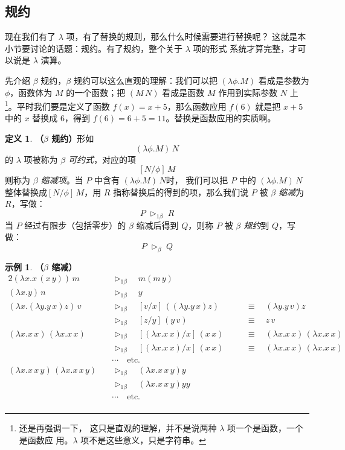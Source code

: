 \documentclass[a4paper,adobefonts]{ctexart}
\theoremstyle{definition}
\newtheorem{definition}{定义}
\newtheorem{example}{示例}
\begin{document}
\subsection{规约}

现在我们有了 $\lambda$ 项，有了替换的规则，那么什么时候需要进行替换呢？
这就是本小节要讨论的话题：规约。有了规约，整个关于 $\lambda$ 项的形式
系统才算完整，才可以说是 $\lambda$ 演算。

先介绍 $\beta$ 规约，$\beta$ 规约可以这么直观的理解：我们可以把
$(\lambda\phi.M)$ 看成是参数为 $\phi$，函数体为 $M$ 的一个函数；把
$(M\,N)$ 看成是函数 $M$ 作用到实际参数 $N$ 上\footnote{还是再强调一下，
  这只是直观的理解，并不是说两种 $\lambda$ 项一个是函数，一个是函数应
  用。$\lambda$ 项不是这些意义，只是字符串。}。平时我们要是定义了函数
$f(x)=x+5$，那么函数应用 $f(6)$ 就是把 $x+5$ 中的 $x$ 替换成 6，得到
$f(6)=6+5=11$。替换是函数应用的实质啊。

\begin{definition}{\bfseries{（$\beta$ 规约）}}\label{def:betareduce}
  形如
  $$
  (\lambda\phi.M)\,N
  $$
  的 $\lambda$ 项被称为 \emph{$\beta$ 可约式}，对应的项
  $$
  [N/\phi]\,M
  $$则称为 \emph{$\beta$ 缩减项}。当 $P$ 中含有 $(\lambda\phi.M)\,N$时，
  我们可以把 $P$ 中的 $(\lambda\phi.M)\,N$ 整体替换成$[N/\phi]\,M$，用
  $R$ 指称替换后的得到的项，那么我们说 $P$ 被 \emph{$\beta$ 缩减}为
  $R$，写做：
  $$
  P\;\triangleright_{1\beta}\;R
  $$当 $P$ 经过有限步（包括零步）的 $\beta$ 缩减后得到 $Q$，则称 $P$
  被 \emph{$\beta$ 规约}到 $Q$，写做：
  $$
  P\;\triangleright_\beta\;Q
  $$
\end{definition}

\newcommand{\betac}{\triangleright_{1\beta}}
\newcommand{\betar}{\triangleright_\beta}

\begin{example}{\bfseries{（$\beta$ 缩减）}}\label{example:beta}
  \begin{alignat*}{2}
    (\lambda x.x\,(x\,y))\,m \quad &\betac\quad  m(m\,y) \\
    (\lambda x.y)\,n \quad &\betac\quad y \\
    (\lambda x.(\lambda y.y\,x)z)\,v\quad &\betac\quad [v/x]\,((\lambda y.y\,x)z) & &\equiv\quad (\lambda y.y\,v)z\\
    &\betac\quad [z/y]\,(y\,v)&\quad &\equiv\quad z\,v \\
    (\lambda x.x\,x)\,(\lambda x.x\,x)\quad &\betac\quad [(\lambda x.x\,x)/x]\,(x\,x) & &\equiv\quad (\lambda x.x\,x)\,(\lambda x.x\,x)\\
    &\betac\quad [(\lambda x.x\,x)/x]\,(x\,x) & &\equiv\quad (\lambda x.x\,x)\,(\lambda x.x\,x)\\
    &\cdots\quad \text{etc.}\\
    (\lambda x.x\,x\,y)\,(\lambda x.x\,x\,y)\quad &\betac\quad (\lambda x.x\,x\,y)y\\
    &\betac\quad (\lambda x.x\,x\,y)yy \\
    &\cdots\quad \text{etc.} \\
  \end{alignat*}
\end{example}
\end{document}
